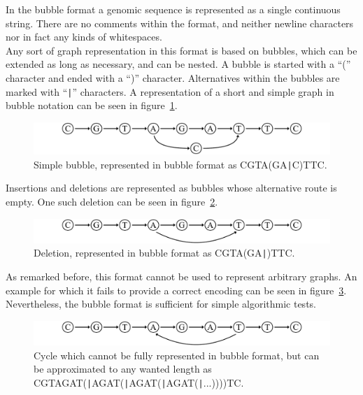 \documentclass[a4paper,12pt,twoside,BCOR=10mm]{scrbook}
\def\pipe{\texttt{|}}
\begin{document}
In the bubble format a genomic sequence is represented as a single continuous string. 
There are no comments within the format, 
and neither newline characters nor in fact any kinds of whitespaces. \\
Any sort of graph representation in this format is based on bubbles, which can be extended as long as necessary, 
and can be nested. A bubble is started with a “(” character and ended 
with a “)” character. Alternatives within the bubbles are marked with “{\!\pipe}” 
characters. 
A representation of a short and simple graph in bubble notation can be seen in figure~\ref{fig:evo_fig_STPUbubble_f}.

\begin{figure}[!htb]
\centering
\includegraphics[width=\textwidth]{evo_fig_STPUbubble_f.pdf}
\caption[Simple bubble in bubble format]{Simple bubble, represented in bubble format as \textup{CGTA(GA\pipe C)TTC}.} \label{fig:evo_fig_STPUbubble_f}
\end{figure}

Insertions and deletions are represented as bubbles whose alternative route is empty. 
One such deletion can be seen in figure~\ref{fig:evo_fig_STPUinsertion_f}.

\begin{figure}[!htb]
\centering
\includegraphics[width=\textwidth]{evo_fig_STPUinsertion_f.pdf}
\caption[Deletion in bubble format]{Deletion, represented in bubble format as \textup{CGTA(GA\pipe )TTC}.} \label{fig:evo_fig_STPUinsertion_f}
\end{figure}

As remarked before, this format cannot be used to represent arbitrary graphs. 
An example for which it fails to provide a correct encoding can be seen in figure~\ref{fig:evo_fig_STPUcycle_f}. 
Nevertheless, the bubble format is sufficient for simple algorithmic tests.

\begin{figure}[!htb]
\centering
\includegraphics[width=\textwidth]{evo_fig_STPUcycle_f.pdf}
\caption[Cycle in bubble format]{Cycle which cannot be fully represented in bubble format, but can be approximated to any wanted length as \textup{CGTAGAT(\pipe AGAT(\pipe AGAT(\pipe AGAT(\pipe ...))))TC}.} \label{fig:evo_fig_STPUcycle_f}
\end{figure}
\end{document}
